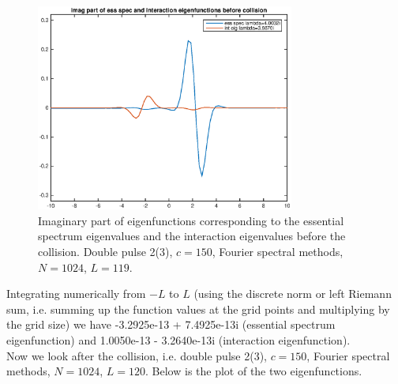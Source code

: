 \documentclass[12pt]{article}
\begin{document}
\begin{figure}[H]
	\includegraphics[width=8.5cm]{eigbeforecollisionimag1.eps}
	\caption{Imaginary part of eigenfunctions corresponding to the essential spectrum eigenvalues and the interaction eigenvalues before the collision. Double pulse 2(3), $c = 150$, Fourier spectral methods, $N = 1024$, $L = 119$. }
\end{figure}


Integrating numerically from $-L$ to $L$ (using the discrete norm or left Riemann sum, i.e. summing up the function values at the grid points and multiplying by the grid size) we have -3.2925e-13 + 7.4925e-13i (essential spectrum eigenfunction) and 1.0050e-13 - 3.2640e-13i (interaction eigenfunction).\\

Now we look after the collision, i.e. double pulse 2(3), $c = 150$, Fourier spectral methods, $N = 1024$, $L = 120$. Below is the plot of the two eigenfunctions.
\end{document}

